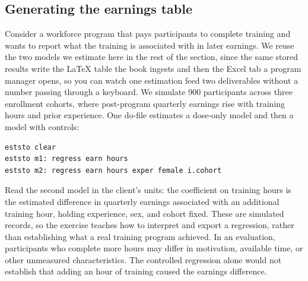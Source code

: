 \documentclass[
    a4paper,
    fontsize=10pt,
    twoside=true,
    numbers=noenddot,
]{kaobook}
\begin{document}
\subsection{Generating the earnings table}\label{sec:ch11-worked-example}
Consider a workforce program that pays participants to complete training and wants to report what the training is associated with in later earnings. We reuse the two models we estimate here in the rest of the section, since the same stored results write the \LaTeX{} table the book ingests and then the Excel tab a program manager opens, so you can watch one estimation feed two deliverables without a number passing through a keyboard. We simulate 900 participants across three enrollment cohorts, where post-program quarterly earnings rise with training hours and prior experience. One do-file estimates a dose-only model and then a model with controls:
\par
{\footnotesize
\begin{verbatim}
eststo clear
eststo m1: regress earn hours
eststo m2: regress earn hours exper female i.cohort
\end{verbatim}
}
Read the second model in the client's units: the coefficient on training hours is the estimated difference in quarterly earnings associated with an additional training hour, holding experience, sex, and cohort fixed. These are simulated records, so the exercise teaches how to interpret and export a regression, rather than establishing what a real training program achieved. In an evaluation, participants who complete more hours may differ in motivation, available time, or other unmeasured characteristics. The controlled regression alone would not establish that adding an hour of training caused the earnings difference.
\end{document}
